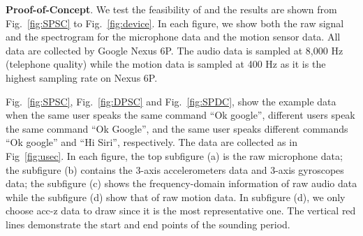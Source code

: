 \textbf{Proof-of-Concept}.
We test the feasibility of {\shortname} and the results are shown from Fig.~\ref{fig:SPSC} to Fig.~\ref{fig:device}. In each figure, we show both the raw signal and the spectrogram for the microphone data and the motion sensor data. All data are collected by Google Nexus 6P. The audio data is sampled at  8,000 Hz (telephone quality) while the motion data is sampled at 400 Hz as it is the highest sampling rate on Nexus 6P.


Fig.~\ref{fig:SPSC}, Fig.~\ref{fig:DPSC}  and  Fig.~\ref{fig:SPDC}, show the example data when the same user speaks the same command ``Ok google'', different users speak the same command ``Ok Google'', and the same user speaks different commands ``Ok google'' and ``Hi Siri'', respectively. The data are collected as in Fig~\ref{fig:usec}.  In each figure, the top subfigure (a) is the raw microphone data; the subfigure (b) contains the 3-axis accelerometers data and 3-axis gyroscopes data; the subfigure (c) shows the frequency-domain information of raw audio data while the subfigure (d) show that of raw motion data. In subfigure (d),  we  only choose acc-z data to draw since it is the most representative one. The vertical red lines demonstrate the start and end points of the sounding period.


